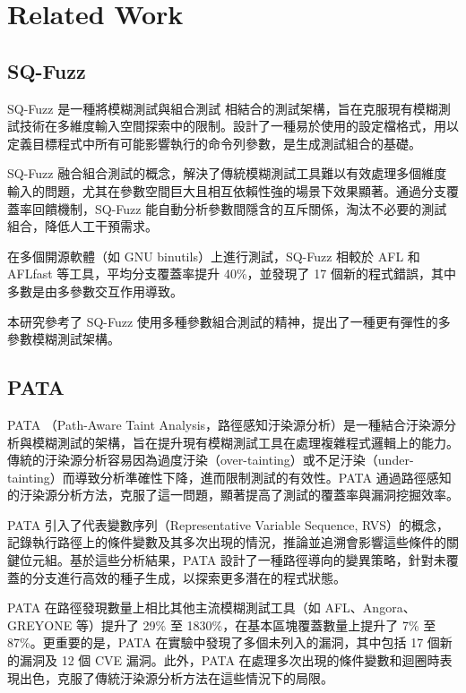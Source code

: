 \chapter{Related Work}
\label{ch:relatedwork}

\section{SQ-Fuzz}

SQ-Fuzz \cite{wu2020sq} 是一種將模糊測試與組合測試 \cite{nie2011survey} 相結合的測試架構，旨在克服現有模糊測試技術在多維度輸入空間探索中的限制。設計了一種易於使用的設定檔格式，用以定義目標程式中所有可能影響執行的命令列參數，是生成測試組合的基礎。

SQ-Fuzz 融合組合測試的概念，解決了傳統模糊測試工具難以有效處理多個維度輸入的問題，尤其在參數空間巨大且相互依賴性強的場景下效果顯著。通過分支覆蓋率回饋機制，SQ-Fuzz 能自動分析參數間隱含的互斥關係，淘汰不必要的測試組合，降低人工干預需求。

在多個開源軟體（如 GNU binutils）上進行測試，SQ-Fuzz 相較於 AFL 和 AFLfast 等工具，平均分支覆蓋率提升 40\%，並發現了 17 個新的程式錯誤，其中多數是由多參數交互作用導致。

本研究參考了 SQ-Fuzz 使用多種參數組合測試的精神，提出了一種更有彈性的多參數模糊測試架構。

\section{PATA}

PATA \cite{liang2022pata}（Path-Aware Taint Analysis，路徑感知汙染源分析）是一種結合汙染源分析與模糊測試的架構，旨在提升現有模糊測試工具在處理複雜程式邏輯上的能力。傳統的汙染源分析容易因為過度汙染（over-tainting）或不足汙染（under-tainting）而導致分析準確性下降，進而限制測試的有效性。PATA 通過路徑感知的汙染源分析方法，克服了這一問題，顯著提高了測試的覆蓋率與漏洞挖掘效率。

PATA 引入了代表變數序列（Representative Variable Sequence, RVS）的概念，記錄執行路徑上的條件變數及其多次出現的情況，推論並追溯會影響這些條件的關鍵位元組。基於這些分析結果，PATA 設計了一種路徑導向的變異策略，針對未覆蓋的分支進行高效的種子生成，以探索更多潛在的程式狀態。

PATA 在路徑發現數量上相比其他主流模糊測試工具（如 AFL、Angora、GREYONE 等）提升了 29\% 至 1830\%，在基本區塊覆蓋數量上提升了 7\% 至 87\%。更重要的是，PATA 在實驗中發現了多個未列入的漏洞，其中包括 17 個新的漏洞及 12 個 CVE 漏洞。此外，PATA 在處理多次出現的條件變數和迴圈時表現出色，克服了傳統汙染源分析方法在這些情況下的局限。


